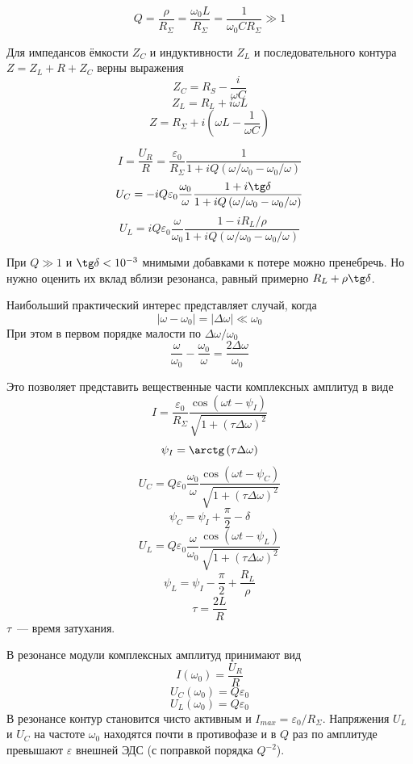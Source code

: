 \[
Q = \frac{ \rho }{R_{ \Sigma }} = \frac{ \omega_{0}L}{R_{ \Sigma }} = \frac{1}{ \omega_{0} C R_{ \Sigma }} \gg 1
\]

Для импедансов ёмкости $Z_{C}$ и индуктивности $Z_{L}$ и последовательного контура $Z=Z_{L}+R+Z_{C}$ верны выражения
\[
    Z_{C} = R_{S} - \frac{i}{ \omega C}
\]
\[
    Z_{L} = R_{L} + i \omega L
\]
\[
    Z = R_{ \Sigma } + i\left( \omega L - \frac{1}{ \omega C}\right)
\]

\[
    I = \frac{U_{R}}{R} = \frac{ \varepsilon_{0}}{R_{ \Sigma }}\frac{1}{1+iQ\left( \omega / \omega_{0} - \omega_{0} / \omega \right)}
\]
\[
    U_{C} = -iQ \varepsilon_{0}\frac{ \omega_{0}}{ \omega }\frac{1+i\tg \delta }{1 + iQ\left( \omega / \omega_{0} - \omega_{0} / \omega \right)}
\]
\[
    U_{L} = iQ \varepsilon_{0}\frac{ \omega }{ \omega_{0}}\frac{1-iR_{L}/ \rho }{1 + iQ\left( \omega  / \omega_{0} - \omega_{0} / \omega \right)}
\]

При $Q\gg 1$ и $\tg \delta < 10^{-3}$ мнимыми добавками к потере можно пренебречь. Но нужно оценить их вклад вблизи резонанса, равный примерно $R_{L} + \rho \tg \delta $.

Наибольший практический интерес представляет случай, когда
\[
    \left| \omega - \omega_{0}\right| = \left| \Delta \omega \right| \ll \omega_{0}
\]
При этом в первом порядке малости по $ \Delta \omega / \omega_{0}$
\[
    \frac{ \omega }{ \omega_{0}} - \frac{ \omega_{0}}{ \omega } = \frac{2 \Delta \omega }{ \omega_{0}}
\]

Это позволяет представить вещественные части комплексных амплитуд в виде
\[
    I = \frac{ \varepsilon_{0}}{R_{ \Sigma }}\frac{\cos\left( \omega t - \psi_{I}\right)}{\sqrt{1 + \left( \tau \Delta \omega \right)^{2}}}
\]
\[
    \psi_{I} = \arctg \left( \tau \Delta \omega \right)
\]
\[
    U_{C} = Q \varepsilon_{0} \frac{ \omega_{0}}{ \omega }\frac{\cos \left( \omega t - \psi_{C}\right)}{\sqrt{1 + \left( \tau \Delta \omega \right)^{2}}}
\]
\[
    \psi_{C} = \psi_{I} + \frac{ \pi }{2} - \delta 
\]
\[
    U_{L} = Q \varepsilon_{0} \frac{ \omega }{ \omega_{0}}\frac{\cos\left( \omega  t - \psi_{L}\right)}{\sqrt{1 + \left( \tau \Delta \omega \right)^{2}}}
\]
\[
    \psi_{L} = \psi_{I} - \frac{ \pi }{2} + \frac{R_{L}}{ \rho }
\]
\[
    \tau = \frac{2L}{R}
\]
$ \tau $~--- время затухания.

В резонансе модули комплексных амплитуд принимают вид
\[
    I( \omega_{0}) = \frac{U_{R}}{R}
\]
\[
    U_{C}( \omega_{0}) = Q \varepsilon_{0}
\]
\[
    U_{L}( \omega_{0}) = Q \varepsilon_{0}
\]
В резонансе контур становится чисто активным и $I_{max} = \varepsilon_{0}/R_{ \Sigma }$. Напряжения $U_{L}$ и $U_{C}$ на частоте $ \omega_{0}$ находятся почти в противофазе и в $Q$ раз по амплитуде
превышают $ \varepsilon $ внешней ЭДС (с поправкой порядка $Q^{-2}$).

